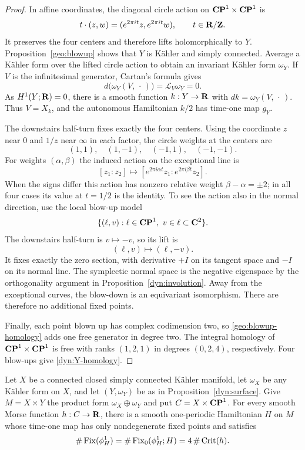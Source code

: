 \begin{proof}
In affine coordinates, the diagonal circle action on
$\mathbf{CP}^1\times\mathbf{CP}^1$ is
\[
  t\cdot(z,w)=(e^{2\pi it}z,e^{2\pi it}w),
  \qquad t\in\mathbf R/\mathbf Z.
\]
It preserves the four centers and therefore lifts holomorphically
to $Y$.  Proposition~\ref{geo:blowup} shows that $Y$ is K\"ahler and
simply connected.  Average a K\"ahler form over the lifted circle
action to obtain an invariant K\"ahler form $\omega_Y$.  If $V$ is
the infinitesimal generator, Cartan's formula gives
\[
  d\bigl(\omega_Y(V,\,\cdot\,)\bigr)
     =\mathcal L_V\omega_Y=0.
\]
As $H^1(Y;\mathbf R)=0$, there is a smooth function $k:Y\to\mathbf R$ with
$dk=\omega_Y(V,\,\cdot\,)$.  Thus $V=X_k$, and the autonomous
Hamiltonian $k/2$ has time-one map $g_Y$.

The downstairs half-turn fixes exactly the four centers.  Using
the coordinate $z$ near $0$ and $1/z$ near $\infty$ in each factor,
the circle weights at the centers are
\[
  (1,1),\quad(1,-1),\quad(-1,1),\quad(-1,-1).
\]
For weights $(\alpha,\beta)$ the induced action on the exceptional
line is
\[
  [z_1:z_2]\longmapsto
  [e^{2\pi i\alpha t}z_1:e^{2\pi i\beta t}z_2].
\]
When the signs differ this action has nonzero relative weight
$\beta-\alpha=\pm2$; in all four cases its value at $t=1/2$ is the
identity.  To see the action also in the normal direction, use the
local blow-up model
\[
  \{(\ell,v):\ell\in\CP^1,\ v\in\ell\subset\C^2\}.
\]
The downstairs half-turn is $v\mapsto-v$, so its lift is
\[
  (\ell,v)\longmapsto(\ell,-v).
\]
It fixes exactly the zero section, with derivative $+I$ on its
tangent space and $-I$ on its normal line.  The symplectic normal
space is the negative eigenspace by the orthogonality argument in
Proposition~\ref{dyn:involution}.  Away from the exceptional curves,
the blow-down is an equivariant isomorphism.  There are therefore
no additional fixed points.

Finally, each point blown up has complex codimension two, so
\eqref{geo:blowup-homology} adds one free generator in degree two.
The integral homology of $\mathbf{CP}^1\times\mathbf{CP}^1$ is free with ranks
$(1,2,1)$ in degrees $(0,2,4)$, respectively.  Four blow-ups give
\eqref{dyn:Y-homology}.
\end{proof}

\begin{corollary}
\label{dyn:product}
Let $X$ be a connected closed simply connected K\"ahler manifold,
let $\omega_X$ be any K\"ahler form on $X$, and let $(Y,\omega_Y)$ be as in
Proposition~\ref{dyn:surface}.  Give $M=X\times Y$ the product form
$\omega_X\oplus\omega_Y$ and put $C=X\times\mathbf{CP}^1$.
For every smooth Morse function $h:C\to\mathbf R$, there is a smooth
one-periodic Hamiltonian $H$ on $M$ whose time-one map has only
nondegenerate fixed points and satisfies
\begin{equation}
\label{dyn:product-count}
  \#\operatorname{Fix}(\phi_H^1)
   =\#\operatorname{Fix}_0(\phi_H^1;H)
   =4\,\#\operatorname{Crit}(h).
\end{equation}
\end{corollary}

